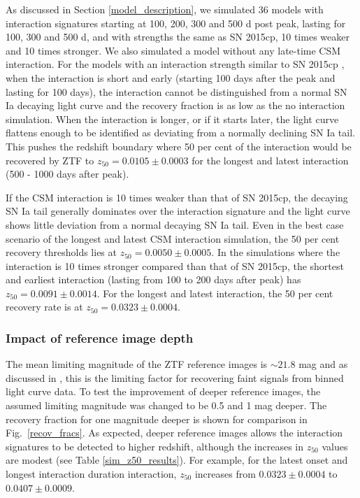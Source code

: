 \documentclass[a4paper,oneside,12pt, class=Latex/Classes/PhDthesisPSnPDF, crop=false]{standalone}
\begin{document}
 As discussed in Section \ref{model_description}, we simulated 36 models with interaction signatures starting at 100, 200, 300 and 500 d post peak, lasting for 100, 300 and 500 d, and with strengths the same as SN 2015cp, 10 times weaker and 10 times stronger. We also simulated a model without any late-time CSM interaction. For the models with an interaction strength similar to SN 2015cp \citep{2015cp}, when the interaction is short and early (starting 100 days after the peak and lasting for 100 days), the interaction cannot be distinguished from a normal SN Ia decaying light curve and the recovery fraction is as low as the no interaction simulation. When the interaction is longer, or if it starts later, the light curve flattens enough to be identified as deviating from a normally declining SN Ia tail. This pushes the redshift boundary where 50 per cent of the interaction would be recovered by ZTF to $z_{50} = 0.0105 \pm 0.0003$ for the longest and latest interaction (500 - 1000 days after peak).

If the CSM interaction is 10 times weaker than that of SN 2015cp, the decaying SN Ia tail generally dominates over the interaction signature and the light curve shows little deviation from a normal decaying SN Ia tail. Even in the best case scenario of the longest and latest CSM interaction simulation, the 50 per cent recovery thresholds lies at $z_{50} = 0.0050 \pm 0.0005$. In the simulations where the interaction is 10 times stronger compared than that of SN 2015cp, the shortest and earliest interaction (lasting from 100 to 200 days after peak) has $z_{50} = 0.0091 \pm 0.0014$. For the longest and latest interaction, the 50 per cent recovery rate is at $z_{50} = 0.0323 \pm 0.0004$.


\subsubsection{Impact of reference image depth}
\label{impact_refdepth}
The mean limiting magnitude of the ZTF reference images is $\sim 21.8$ mag and as discussed in \citep{ref_uncert}, this is the limiting factor for recovering faint signals from binned light curve data. To test the improvement of deeper reference images, the assumed limiting magnitude was changed to be 0.5 and 1 mag deeper. The recovery fraction for one magnitude deeper is shown for comparison in Fig.~\ref{recov_fracs}. As expected, deeper reference images allows the interaction signatures to be detected to higher redshift, although the increases in $z_{50}$ values are modest (see Table \ref{sim_z50_results}). For example, for the latest onset and longest interaction duration interaction, $z_{50}$ increases from $0.0323 \pm 0.0004$ to $0.0407 \pm 0.0009$.
\end{document}
